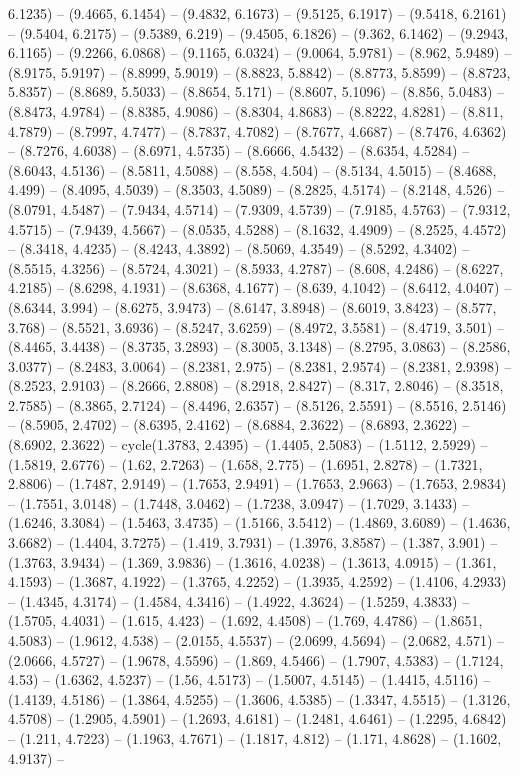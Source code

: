 6.1235) -- (9.4665, 6.1454) -- (9.4832, 6.1673) -- (9.5125, 6.1917) -- (9.5418, 6.2161) -- (9.5404, 6.2175) -- (9.5389, 6.219) -- (9.4505, 6.1826) -- (9.362, 6.1462) -- (9.2943, 6.1165) -- (9.2266, 6.0868) -- (9.1165, 6.0324) -- (9.0064, 5.9781) -- (8.962, 5.9489) -- (8.9175, 5.9197) -- (8.8999, 5.9019) -- (8.8823, 5.8842) -- (8.8773, 5.8599) -- (8.8723, 5.8357) -- (8.8689, 5.5033) -- (8.8654, 5.171) -- (8.8607, 5.1096) -- (8.856, 5.0483) -- (8.8473, 4.9784) -- (8.8385, 4.9086) -- (8.8304, 4.8683) -- (8.8222, 4.8281) -- (8.811, 4.7879) -- (8.7997, 4.7477) -- (8.7837, 4.7082) -- (8.7677, 4.6687) -- (8.7476, 4.6362) -- (8.7276, 4.6038) -- (8.6971, 4.5735) -- (8.6666, 4.5432) -- (8.6354, 4.5284) -- (8.6043, 4.5136) -- (8.5811, 4.5088) -- (8.558, 4.504) -- (8.5134, 4.5015) -- (8.4688, 4.499) -- (8.4095, 4.5039) -- (8.3503, 4.5089) -- (8.2825, 4.5174) -- (8.2148, 4.526) -- (8.0791, 4.5487) -- (7.9434, 4.5714) -- (7.9309, 4.5739) -- (7.9185, 4.5763) -- (7.9312, 4.5715) -- (7.9439, 4.5667) -- (8.0535, 4.5288) -- (8.1632, 4.4909) -- (8.2525, 4.4572) -- (8.3418, 4.4235) -- (8.4243, 4.3892) -- (8.5069, 4.3549) -- (8.5292, 4.3402) -- (8.5515, 4.3256) -- (8.5724, 4.3021) -- (8.5933, 4.2787) -- (8.608, 4.2486) -- (8.6227, 4.2185) -- (8.6298, 4.1931) -- (8.6368, 4.1677) -- (8.639, 4.1042) -- (8.6412, 4.0407) -- (8.6344, 3.994) -- (8.6275, 3.9473) -- (8.6147, 3.8948) -- (8.6019, 3.8423) -- (8.577, 3.768) -- (8.5521, 3.6936) -- (8.5247, 3.6259) -- (8.4972, 3.5581) -- (8.4719, 3.501) -- (8.4465, 3.4438) -- (8.3735, 3.2893) -- (8.3005, 3.1348) -- (8.2795, 3.0863) -- (8.2586, 3.0377) -- (8.2483, 3.0064) -- (8.2381, 2.975) -- (8.2381, 2.9574) -- (8.2381, 2.9398) -- (8.2523, 2.9103) -- (8.2666, 2.8808) -- (8.2918, 2.8427) -- (8.317, 2.8046) -- (8.3518, 2.7585) -- (8.3865, 2.7124) -- (8.4496, 2.6357) -- (8.5126, 2.5591) -- (8.5516, 2.5146) -- (8.5905, 2.4702) -- (8.6395, 2.4162) -- (8.6884, 2.3622) -- (8.6893, 2.3622) -- (8.6902, 2.3622) -- cycle(1.3783, 2.4395) -- (1.4405, 2.5083) -- (1.5112, 2.5929) -- (1.5819, 2.6776) -- (1.62, 2.7263) -- (1.658, 2.775) -- (1.6951, 2.8278) -- (1.7321, 2.8806) -- (1.7487, 2.9149) -- (1.7653, 2.9491) -- (1.7653, 2.9663) -- (1.7653, 2.9834) -- (1.7551, 3.0148) -- (1.7448, 3.0462) -- (1.7238, 3.0947) -- (1.7029, 3.1433) -- (1.6246, 3.3084) -- (1.5463, 3.4735) -- (1.5166, 3.5412) -- (1.4869, 3.6089) -- (1.4636, 3.6682) -- (1.4404, 3.7275) -- (1.419, 3.7931) -- (1.3976, 3.8587) -- (1.387, 3.901) -- (1.3763, 3.9434) -- (1.369, 3.9836) -- (1.3616, 4.0238) -- (1.3613, 4.0915) -- (1.361, 4.1593) -- (1.3687, 4.1922) -- (1.3765, 4.2252) -- (1.3935, 4.2592) -- (1.4106, 4.2933) -- (1.4345, 4.3174) -- (1.4584, 4.3416) -- (1.4922, 4.3624) -- (1.5259, 4.3833) -- (1.5705, 4.4031) -- (1.615, 4.423) -- (1.692, 4.4508) -- (1.769, 4.4786) -- (1.8651, 4.5083) -- (1.9612, 4.538) -- (2.0155, 4.5537) -- (2.0699, 4.5694) -- (2.0682, 4.571) -- (2.0666, 4.5727) -- (1.9678, 4.5596) -- (1.869, 4.5466) -- (1.7907, 4.5383) -- (1.7124, 4.53) -- (1.6362, 4.5237) -- (1.56, 4.5173) -- (1.5007, 4.5145) -- (1.4415, 4.5116) -- (1.4139, 4.5186) -- (1.3864, 4.5255) -- (1.3606, 4.5385) -- (1.3347, 4.5515) -- (1.3126, 4.5708) -- (1.2905, 4.5901) -- (1.2693, 4.6181) -- (1.2481, 4.6461) -- (1.2295, 4.6842) -- (1.211, 4.7223) -- (1.1963, 4.7671) -- (1.1817, 4.812) -- (1.171, 4.8628) -- (1.1602, 4.9137) -- 